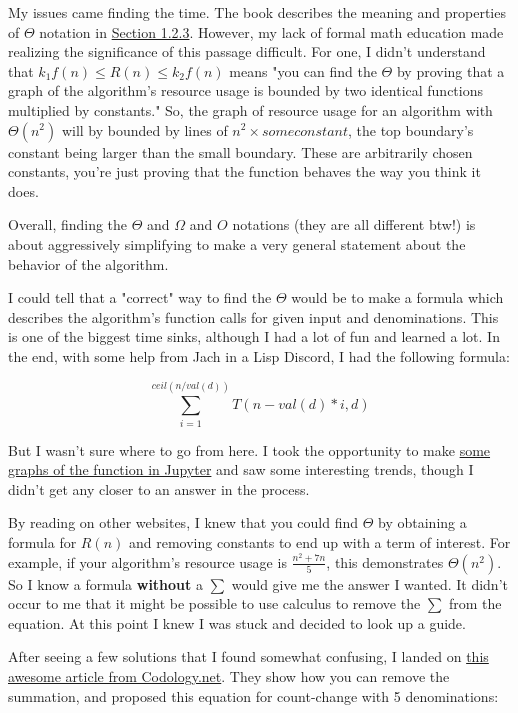 \documentclass[
]{article}
\begin{document}
My issues came finding the time. The book describes the meaning and
properties of \(\Theta\) notation in
\href{http://sarabander.github.io/sicp/html/1_002e2.xhtml\#g_t1_002e2_002e3}{Section
1.2.3}. However, my lack of formal math education made realizing the
significance of this passage difficult. For one, I didn't understand
that \(k_{1}f(n) \leq R(n) \leq k_{2}f(n)\) means "you can find the
\(\Theta\) by proving that a graph of the algorithm's resource usage is
bounded by two identical functions multiplied by constants." So, the
graph of resource usage for an algorithm with \(\Theta(n^{2})\) will by
bounded by lines of \(n^{2} \times some constant\), the top boundary's
constant being larger than the small boundary. These are arbitrarily
chosen constants, you're just proving that the function behaves the way
you think it does.

Overall, finding the \(\Theta\) and \(\Omega\) and \(O\) notations (they
are all different btw!) is about aggressively simplifying to make a very
general statement about the behavior of the algorithm.

I could tell that a "correct" way to find the \(\Theta\) would be to
make a formula which describes the algorithm's function calls for given
input and denominations. This is one of the biggest time sinks, although
I had a lot of fun and learned a lot. In the end, with some help from
Jach in a Lisp Discord, I had the following formula:

\[
\sum_{i=1}^{ceil(n / val(d))} T(n - val(d)*i, d)
\]

But I wasn't sure where to go from here. I took the opportunity to make
\href{file:///1/cc/Ways\%20to\%20Make\%20Changes\%20Analyzed.ipynb}{some
graphs of the function in Jupyter} and saw some interesting trends,
though I didn't get any closer to an answer in the process.

By reading on other websites, I knew that you could find \(\Theta\) by
obtaining a formula for \(R(n)\) and removing constants to end up with a
term of interest. For example, if your algorithm's resource usage is
\(\frac{n^{2} + 7n}{5}\), this demonstrates \(\Theta(n^{2})\). So I know
a formula \textbf{without} a \(\sum\) would give me the answer I wanted.
It didn't occur to me that it might be possible to use calculus to
remove the \(\sum\) from the equation. At this point I knew I was stuck
and decided to look up a guide.

After seeing a few solutions that I found somewhat confusing, I landed
on \href{https://codology.net/post/sicp-solution-exercise-1-14/}{this
awesome article from Codology.net}. They show how you can remove the
summation, and proposed this equation for count-change with 5
denominations:
\end{document}
